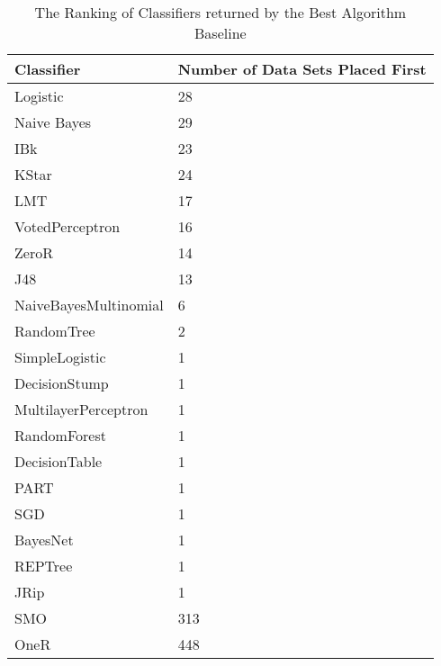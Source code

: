 \begin{table}[h]
\centering
	\begin{tabularx}{\textwidth}{X | X}
		Classifier				&	Number of Data Sets Placed First \\	\hline
		Logistic				&	28								\\	\hline	
		Naive Bayes				&	29								\\	\hline	
		IBk						&	23								\\	\hline	
		KStar					&	24								\\	\hline	
		LMT						&	17								\\	\hline	
		VotedPerceptron			&	16								\\	\hline	
		ZeroR					&	14								\\	\hline	
		J48						&	13								\\	\hline	
		NaiveBayesMultinomial	&	6								\\	\hline	
		RandomTree				&	2								\\	\hline	
		SimpleLogistic			&	1								\\	\hline
		DecisionStump			&	1								\\	\hline
		MultilayerPerceptron	&	1								\\	\hline
		RandomForest			&	1								\\	\hline
		DecisionTable			&	1								\\	\hline
		PART					&	1								\\	\hline
		SGD						&	1								\\	\hline
		BayesNet				&	1								\\	\hline
		REPTree					&	1								\\	\hline
		JRip					&	1								\\	\hline
		SMO						&	313								\\	\hline
		OneR					&	448								\\	\hline						\end{tabularx}
	\label{tab:bestAglorithmRanking}
	\caption{The Ranking of Classifiers returned by the Best Algorithm Baseline}
\end{table}